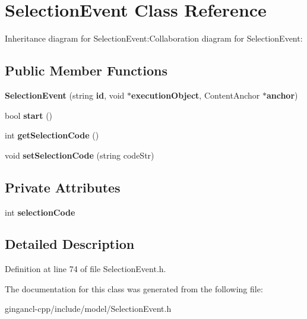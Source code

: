 \section{SelectionEvent Class Reference}
\label{classbr_1_1pucrio_1_1telemidia_1_1ginga_1_1ncl_1_1model_1_1event_1_1SelectionEvent}
Inheritance diagram for SelectionEvent:Collaboration diagram for SelectionEvent:\subsection*{Public Member Functions}
\begin{CompactItemize}
\item 
\textbf{SelectionEvent} (string {\bf id}, void $\ast${\bf executionObject}, ContentAnchor $\ast${\bf anchor})\label{classbr_1_1pucrio_1_1telemidia_1_1ginga_1_1ncl_1_1model_1_1event_1_1SelectionEvent_75f283c3ee4f78bce7a661634c30474b}

\item 
bool \textbf{start} ()\label{classbr_1_1pucrio_1_1telemidia_1_1ginga_1_1ncl_1_1model_1_1event_1_1SelectionEvent_ad5997aaaa2d622f0ca57f8b24a51a7b}

\item 
int \textbf{getSelectionCode} ()\label{classbr_1_1pucrio_1_1telemidia_1_1ginga_1_1ncl_1_1model_1_1event_1_1SelectionEvent_257c4293781dc7c4628638412ad394aa}

\item 
void \textbf{setSelectionCode} (string codeStr)\label{classbr_1_1pucrio_1_1telemidia_1_1ginga_1_1ncl_1_1model_1_1event_1_1SelectionEvent_08a64bc9f006c0b74183d3c510ff688f}

\end{CompactItemize}
\subsection*{Private Attributes}
\begin{CompactItemize}
\item 
int {\bf selectionCode}\label{classbr_1_1pucrio_1_1telemidia_1_1ginga_1_1ncl_1_1model_1_1event_1_1SelectionEvent_eb9995048038af1d47fa9be02c6a6f54}

\end{CompactItemize}


\subsection{Detailed Description}




Definition at line 74 of file SelectionEvent.h.

The documentation for this class was generated from the following file:\begin{CompactItemize}
\item 
gingancl-cpp/include/model/SelectionEvent.h\end{CompactItemize}
